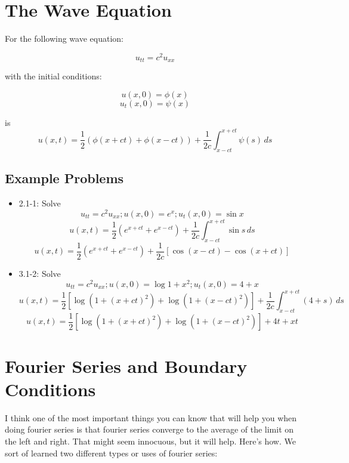 \documentclass{article}
\begin{document}
\section{The Wave Equation}

For the following wave equation:

$$u_{tt} = c^2u_{xx}$$

with the initial conditions:

$$u(x,0) = \phi(x)$$
$$u_t(x,0) = \psi(x)$$

is
$$u(x,t) = \frac{1}{2}\left(\phi(x + ct) + \phi(x-ct)\right) + \frac{1}{2c} \int_{x-ct}^{x+ct} \psi(s) \,ds $$


\subsection{Example Problems}
\begin{itemize}

    \item 2.1-1:
    Solve $$u_{tt} = c^2u_{xx} ; u(x,0) = e^x ; u_t(x,0) = \sin{x}$$
    $$u(x,t) = \frac{1}{2}\left(e^{x + ct} + e^{x - ct}\right) + \frac{1}{2c}\int_{x-ct}^{x+ct} \sin{s} \,ds$$
$$u(x,t) =  \frac{1}{2}\left(e^{x + ct} + e^{x - ct}\right) + \frac{1}{2c} [\cos{(x-ct)}-\cos{(x+ct)}] $$
    \item 3.1-2:
    Solve $$u_{tt} = c^2u_{xx} ; u(x,0) = \log{1 + x^2} ; u_t(x,0) = 4 + x$$
    $$u(x,t) = \frac{1}{2}\left[\log{\left(1 + (x + ct)^2\right)}+\log{\left(1 + (x - ct)^2\right)}\right] + \frac{1}{2c}\int_{x-ct}^{x+ct} (4+s) \,ds$$    
    $$u(x,t) = \frac{1}{2}\left[\log{\left(1 + (x + ct)^2\right)}+\log{\left(1 + (x - ct)^2\right)}\right] + 4t + xt$$   
\end{itemize}

\newpage
\section{Fourier Series and Boundary Conditions}

I think one of the most important things you can know that will help you when doing fourier series is that fourier series converge to the average of the limit on the left and right. That might seem innocuous, but it will help. Here's how.  We sort of learned two different types or uses of fourier series:
\end{document}
